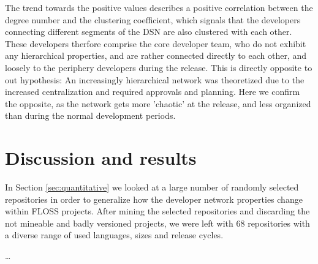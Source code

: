 The trend towards the positive values describes a positive correlation between the degree number and the clustering coefficient, which signals that the developers connecting different segments of the DSN are also clustered with each other. These developers therfore comprise the core developer team, who do not exhibit any hierarchical properties, and are rather connected directly to each other, and loosely to the periphery developers during the release. This is directly opposite to out hypothesis: An increasingly hierarchical network was theoretized due to the increased centralization and required approvals and planning. Here we confirm the opposite, as the network gets more 'chaotic' at the release, and less organized than during the normal development periods.

\section{Discussion and results}

In Section \ref{sec:quantitative} we looked at a large number of randomly selected repositories in order to generalize how the developer network properties change within FLOSS projects. After mining the selected repositories and discarding the not mineable and badly versioned projects, we were left with 68 repositories with a diverse range of used languages, sizes and release cycles. 

\dots

